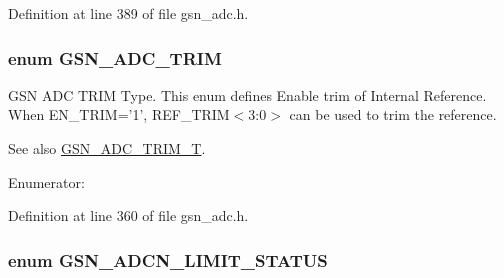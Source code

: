 Definition at line 389 of file gsn\_\-adc.h.

\hypertarget{a00643_gae2b441d4a96a542d5d290e1454fbaa1d}{
\subsubsection[{GSN\_\-ADC\_\-TRIM}]{\setlength{\rightskip}{0pt plus 5cm}enum {\bf GSN\_\-ADC\_\-TRIM}}}
\label{a00643_gae2b441d4a96a542d5d290e1454fbaa1d}


GSN ADC TRIM Type. This enum defines Enable trim of Internal Reference. When EN\_\-TRIM='1', REF\_\-TRIM$<$3:0$>$ can be used to trim the reference. 

\begin{DoxySeeAlso}{See also}
\hyperlink{a00643_gace83cba6b68fe265f09d30cda1ef0e63}{GSN\_\-ADC\_\-TRIM\_\-T}. 
\end{DoxySeeAlso}
\begin{Desc}
\item[Enumerator: ]\par
\begin{description}
\item[{\em 
\hypertarget{a00643_ggae2b441d4a96a542d5d290e1454fbaa1da3a85d4591047f6621e3d6299a52424f8}{
GSN\_\-ADC\_\-TRIM\_\-DISABLE}
\label{a00643_ggae2b441d4a96a542d5d290e1454fbaa1da3a85d4591047f6621e3d6299a52424f8}
}]\item[{\em 
\hypertarget{a00643_ggae2b441d4a96a542d5d290e1454fbaa1da4120ed751791cc81cc336e056a238a77}{
GSN\_\-ADC\_\-TRIM\_\-ENABLE}
\label{a00643_ggae2b441d4a96a542d5d290e1454fbaa1da4120ed751791cc81cc336e056a238a77}
}]\end{description}
\end{Desc}



Definition at line 360 of file gsn\_\-adc.h.

\hypertarget{a00643_ga008458c1074bf0e3aace6adfc8a9a7d7}{
\subsubsection[{GSN\_\-ADCN\_\-LIMIT\_\-STATUS}]{\setlength{\rightskip}{0pt plus 5cm}enum {\bf GSN\_\-ADCN\_\-LIMIT\_\-STATUS}}}
\label{a00643_ga008458c1074bf0e3aace6adfc8a9a7d7}



